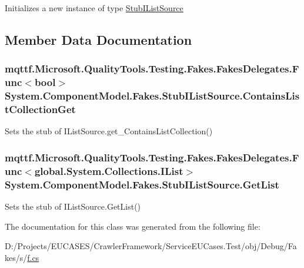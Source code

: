 Initializes a new instance of type \hyperlink{class_system_1_1_component_model_1_1_fakes_1_1_stub_i_list_source}{Stub\-I\-List\-Source}



\subsection{Member Data Documentation}
\hypertarget{class_system_1_1_component_model_1_1_fakes_1_1_stub_i_list_source_a7751e3c6ed4574c1edb9d153b4ab3802}{
\subsubsection[{Contains\-List\-Collection\-Get}]{\setlength{\rightskip}{0pt plus 5cm}mqttf.\-Microsoft.\-Quality\-Tools.\-Testing.\-Fakes.\-Fakes\-Delegates.\-Func$<$bool$>$ System.\-Component\-Model.\-Fakes.\-Stub\-I\-List\-Source.\-Contains\-List\-Collection\-Get}}\label{class_system_1_1_component_model_1_1_fakes_1_1_stub_i_list_source_a7751e3c6ed4574c1edb9d153b4ab3802}


Sets the stub of I\-List\-Source.\-get\-\_\-\-Contains\-List\-Collection()

\hypertarget{class_system_1_1_component_model_1_1_fakes_1_1_stub_i_list_source_a5db6ff8c35007dbd8fb931eb904576bd}{
\subsubsection[{Get\-List}]{\setlength{\rightskip}{0pt plus 5cm}mqttf.\-Microsoft.\-Quality\-Tools.\-Testing.\-Fakes.\-Fakes\-Delegates.\-Func$<$global.\-System.\-Collections.\-I\-List$>$ System.\-Component\-Model.\-Fakes.\-Stub\-I\-List\-Source.\-Get\-List}}\label{class_system_1_1_component_model_1_1_fakes_1_1_stub_i_list_source_a5db6ff8c35007dbd8fb931eb904576bd}


Sets the stub of I\-List\-Source.\-Get\-List()



The documentation for this class was generated from the following file\-:\begin{DoxyCompactItemize}
\item 
D\-:/\-Projects/\-E\-U\-C\-A\-S\-E\-S/\-Crawler\-Framework/\-Service\-E\-U\-Cases.\-Test/obj/\-Debug/\-Fakes/s/\hyperlink{s_2f_8cs}{f.\-cs}\end{DoxyCompactItemize}
